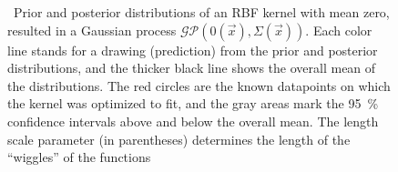 \begin{figure}[t]
	\centering
	\hfill %
	\caption[Prior and posterior of RBF kernel]
		{\hspace{-0.18cm}\footnotemark\ 
		Prior and posterior distributions of an RBF kernel with mean zero, resulted in a Gaussian process $\mathcal{GP}\left( 0 (\vec{x}), \Sigma(\vec{x}) \right)$.
		Each color line stands for a drawing (prediction) from the prior and posterior distributions, and the thicker black line shows the overall mean of the distributions.
		The red circles are the known datapoints on which the kernel was optimized to fit, and the gray areas mark the \SI{95}{\percent} confidence intervals above and below the overall mean.
		The length scale parameter (in parentheses) determines the length of the \enquote{wiggles} of the functions}
	\label{fig:RBF_prior_posterior}
\end{figure}


